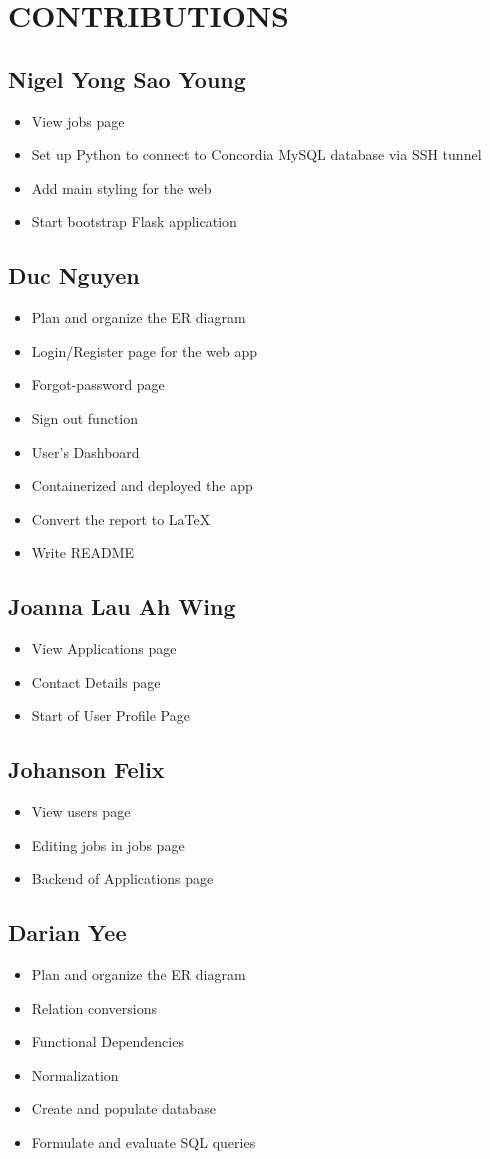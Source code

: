 \newpage
\section{CONTRIBUTIONS}
\subsection{Nigel Yong Sao Young}
\begin{itemize}
    \item View jobs page
    \item Set up Python to connect to Concordia MySQL database via SSH tunnel
    \item Add main styling for the web
    \item Start bootstrap Flask application
\end{itemize}

\subsection{Duc Nguyen}
\begin{itemize}
    \item Plan and organize the ER diagram
    \item Login/Register page for the web app
    \item Forgot-password page
    \item Sign out function
    \item User's Dashboard
    \item Containerized and deployed the app
    \item Convert the report to LaTeX
    \item Write README
\end{itemize}

\subsection{Joanna Lau Ah Wing}
\begin{itemize}
    \item View Applications page
    \item Contact Details page
    \item Start of User Profile Page
\end{itemize}

\subsection{Johanson Felix}
\begin{itemize}
    \item View users page
    \item Editing jobs in jobs page
    \item Backend of Applications page
\end{itemize}

\subsection{Darian Yee}
\begin{itemize}
    \item Plan and organize the ER diagram
    \item Relation conversions
    \item Functional Dependencies
    \item Normalization
    \item Create and populate database
    \item Formulate and evaluate SQL queries
\end{itemize}
